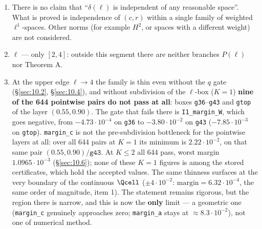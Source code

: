 \begin{enumerate}
\item There is no claim that ``$\delta(\ell)$ is independent of any reasonable space''.
   What is proved is independence of $(c,r)$ within a single family of
   weighted $\ell^1$-spaces. Other norms (for example $H^2$, or spaces with a
   different weight) are not considered.

\item $\ell$ --- only $[2,4]$: outside this segment there are neither branches
   $P(\ell)$ nor Theorem A.

\item At the upper edge $\ell \to 4$ the family is thin even without the $q$
   gate (\S\ref{sec:10.2}, \S\ref{sec:10.4}), and without subdivision of the
   $\ell$-box ($K = 1$) \textbf{nine of the 644 pointwise pairs do not pass at
   all}: boxes \texttt{g36}--\texttt{g43} and \texttt{gtop} of the layer
   $(0.55, 0.90)$. The gate that fails there is \texttt{I1\_margin\_W}, which
   goes negative, from $-4.73\cdot 10^{-4}$ on \texttt{g36} to
   $-3.80\cdot 10^{-2}$ on \texttt{g43} ($-7.85\cdot 10^{-3}$ on \texttt{gtop}).
   \texttt{margin\_c} is not the pre-subdivision bottleneck for the pointwise
   layers at all: over all 644 pairs at $K = 1$ its minimum is
   $2.22\cdot 10^{-2}$, on that same pair $(0.55,0.90)/\texttt{g43}$. At
   $K \le 2$ all 644 pass, worst margin $1.0965\cdot 10^{-3}$
   (\S\ref{sec:10.6}); none of these $K = 1$ figures is among the stored
   certificates, which hold the accepted values. The same thinness surfaces at the very
   boundary of the continuous $\Qcell$ ($\pm 4\cdot 10^{-2}$: $\mathrm{margin} = 6.32\cdot 10^{-4}$, the
   same order of magnitude, item 1). The statement remains rigorous, but
   the region there is narrow, and this is now the \textbf{only} limit --- a
   geometric one (\texttt{margin\_c} genuinely approaches zero; \texttt{margin\_a} stays
   at $\approx 8.3\cdot 10^{-2}$), not one of numerical method.


\end{enumerate}
